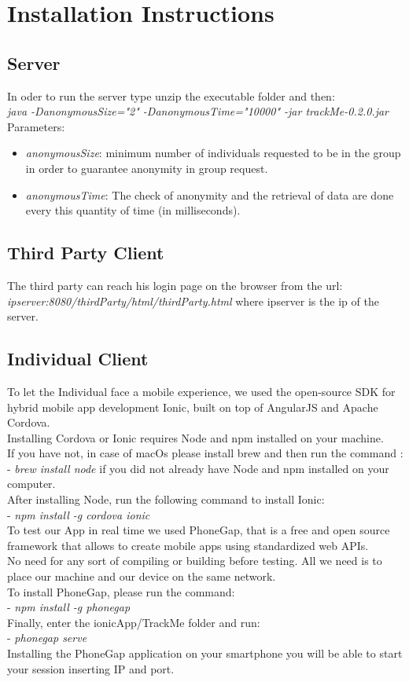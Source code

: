 \section{Installation Instructions} 

\subsection{Server}
In oder to run the server type unzip the executable folder and then: \\
\textit{java -DanonymousSize="2" -DanonymousTime="10000" -jar trackMe-0.2.0.jar}
Parameters:
\begin{itemize}
	\item \textit{anonymousSize}: minimum number of individuals requested to be in the group in order to guarantee anonymity in group request.
	\item \textit{anonymousTime}: The check of anonymity and the retrieval of data are done every this quantity of time (in milliseconds).
\end{itemize}

\subsection{Third Party Client}
The third party can reach his login page on the browser from the url:\\ \textit{ipserver:8080/thirdParty/html/thirdParty.html} where ipserver is the ip of the server.

\subsection{Individual Client}
 To let the Individual face a mobile experience, we used the open-source SDK for hybrid mobile app development Ionic, built on top of AngularJS and Apache Cordova.\\	Installing Cordova or Ionic requires Node and npm installed on your machine. \\If you have not, in case of macOs please install brew and then run the command :\\
 - \textit{brew install node} if you did not already have Node and npm installed on your computer.\\
After installing Node, run the following command to install Ionic:\\
- \textit{npm install -g cordova ionic}\\
To test our App in real time we used PhoneGap, that is a free and open source framework that allows to create mobile apps using standardized web APIs.\\No need for any sort of compiling or building before testing. All we need is to place our machine and our device on the same network.\\
To install PhoneGap, please run the command:\\
- \textit{npm install -g phonegap}\\
Finally, enter the ionicApp/TrackMe folder and run:\\
- \textit{phonegap serve}\\
Installing the PhoneGap application on your smartphone you will be able to start your session inserting IP and port.
 